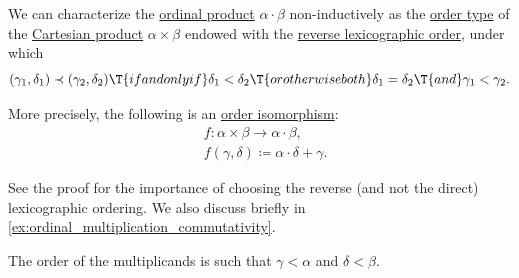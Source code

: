 \begin{proposition}\label{thm:ordinal_multiplication_cartesian_product}
  We can characterize the \hyperref[def:ordinal_multiplication]{ordinal product} \( \alpha \cdot \beta \) non-inductively as the  \hyperref[def:well_ordered_order_type]{order type} of the \hyperref[def:cartesian_product]{Cartesian product} \( \alpha \times \beta \) endowed with the \hyperref[def:lexicographic_order]{reverse lexicographic order}, under which
  \begin{equation*}
    (\gamma_1, \delta_1) \prec (\gamma_2, \delta_2) \T{if and only if} \delta_1 < \delta_2 \T{or otherwise both} \delta_1 = \delta_2 \T{and} \gamma_1 < \gamma_2.
  \end{equation*}

  More precisely, the following is an \hyperref[def:partially_ordered_set/morphism]{order isomorphism}:
  \begin{equation*}
    \begin{aligned}
      &f: \alpha \times \beta \to \alpha \cdot \beta, \\
      &f(\gamma, \delta) \coloneqq \alpha \cdot \delta + \gamma.
    \end{aligned}
  \end{equation*}
\end{proposition}
\begin{comments}
  \item See the proof for the importance of choosing the reverse (and not the direct) lexicographic ordering. We also discuss briefly in \cref{ex:ordinal_multiplication_commutativity}.

  \item The order of the multiplicands is such that \( \gamma < \alpha \) and \( \delta < \beta \).
\end{comments}
